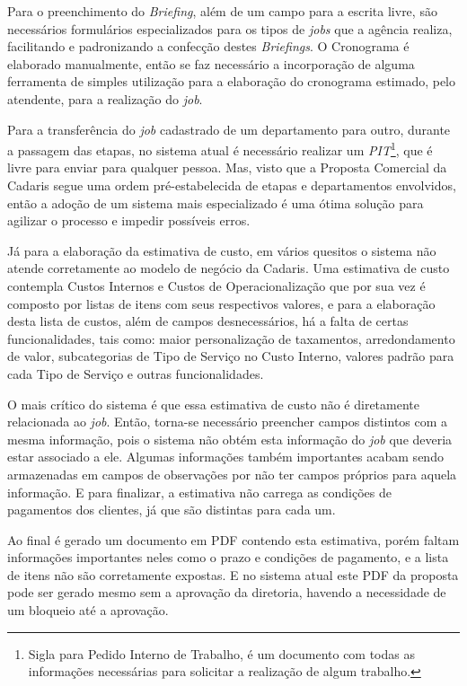 \documentclass[
  12pt,				%
  openany,
  oneside,
  a4paper,			%
  english,			%
  brazil
]{article}
\numberwithin{figure}{section}
\numberwithin{table}{section}
\begin{document}
Para o preenchimento do \textit{Briefing}, além de um campo para a escrita livre, são necessários formulários especializados para os tipos de \textit{jobs} que a agência realiza, facilitando e padronizando a confecção destes \textit{Briefings}. O Cronograma é elaborado manualmente, então se faz necessário a incorporação de alguma ferramenta de simples utilização para a elaboração do cronograma estimado, pelo atendente, para a realização do \textit{job}.

Para a transferência do \textit{job} cadastrado de um departamento para outro, durante a passagem das etapas, no sistema atual é necessário realizar um \textit{PIT}\footnote{Sigla para Pedido Interno de Trabalho, é um documento com todas as informações necessárias para solicitar a realização de algum trabalho.}, que é livre para enviar para qualquer pessoa. Mas, visto que a Proposta Comercial da Cadaris segue uma ordem pré-estabelecida de etapas e departamentos envolvidos, então a adoção de um sistema mais especializado é uma ótima solução para agilizar o processo e impedir possíveis erros.

Já para a elaboração da estimativa de custo, em vários quesitos o sistema não atende corretamente ao modelo de negócio da Cadaris. Uma estimativa de custo contempla Custos Internos e Custos de Operacionalização que por sua vez é composto por listas de itens com seus respectivos valores, e para a elaboração desta lista de custos, além de campos desnecessários, há a falta de certas funcionalidades, tais como: maior personalização de taxamentos, arredondamento de valor, subcategorias de Tipo de Serviço no Custo Interno, valores padrão para cada Tipo de Serviço e outras funcionalidades. 

O mais crítico do sistema é que essa estimativa de custo não é diretamente relacionada ao \textit{job}. Então, torna-se necessário preencher campos distintos com a mesma informação, pois o sistema não obtém esta informação do \textit{job} que deveria estar associado a ele. Algumas informações também importantes acabam sendo armazenadas em campos de observações por não ter campos próprios para aquela informação. E para finalizar, a estimativa não carrega as condições de pagamentos dos clientes, já que são distintas para cada um.

Ao final é gerado um documento em PDF contendo esta estimativa, porém faltam informações importantes neles como o prazo e condições de pagamento, e a lista de itens não são corretamente expostas. E no sistema atual este PDF da proposta pode ser gerado mesmo sem a aprovação da diretoria, havendo a necessidade de um bloqueio até a aprovação.
\end{document}
